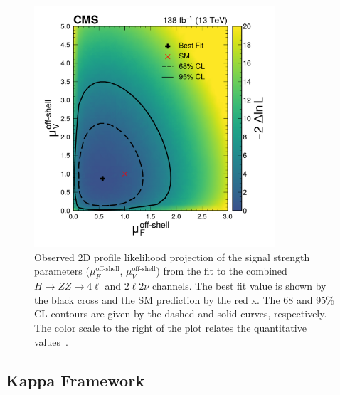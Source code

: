 \begin{figure}[!hbt]
  \centering
  \includegraphics[width=0.8\textwidth]{figures/Figure_012.pdf}  
  \caption
      {
        Observed 2D profile likelihood projection of the \offshell signal strength parameters ($\mu^\text{off-shell}_{F}$, $\mu^\text{off-shell}_{V}$) 
        from the fit to the combined \offshell $H\to ZZ\to4\ell$ and $2\ell2\nu$ channels. The best fit value is shown by the black cross and the SM 
        prediction by the red x. The 68 and 95\% CL contours are given by the dashed and solid curves, respectively. The color scale to the right of the plot relates the quantitative values~\cite{PhysRevD.111.092014}.
      }
    \label{fig:muoffshell} 
\end{figure}

\subsection{Kappa Framework}


